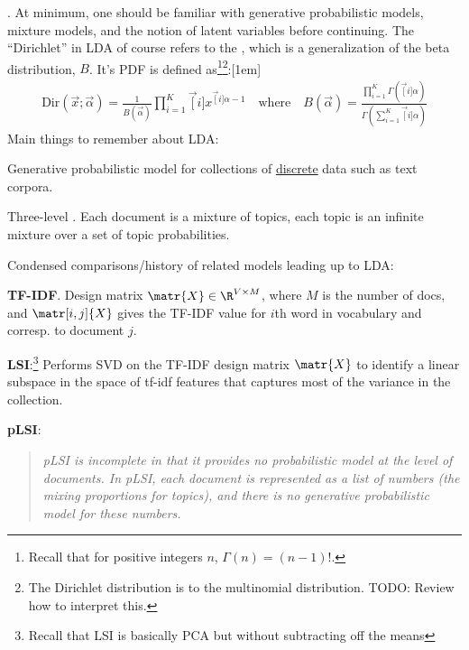 \documentclass[11pt]{article}
\begin{document}
\myspace
\p {}. At minimum, one should be familiar with generative probabilistic models, mixture models, and the notion of latent variables before continuing. The ``Dirichlet'' in LDA of course refers to the , which is a generalization of the beta distribution, $B$. It's PDF is defined as\footnote{
	Recall that for positive integers $n$, $\Gamma(n) = (n - 1)!$.
}\footnote{The Dirichlet distribution is  to the multinomial distribution. TODO: Review how to interpret this.}:[1em]
\begin{align}
\text{Dir}(\vec{x}; \vec{\alpha}) = \frac{1}{B(\vec{\alpha})} \prod_{i=1}^{K} \vec[i]{x}^{\vec[i]{\alpha} - 1} 
\quad \text{where} \quad
B(\vec{\alpha}) = \frac{ \prod_{i=1}^{K} \Gamma\left( \vec[i]{\alpha}\right) }{  \Gamma(\sum_{i=1}^{K} \vec[i]{\alpha}) }
\label{dirichlet}
\end{align}
Main things to remember about LDA:
\begin{compactitem}[-]
	\item Generative probabilistic model for collections of \underline{discrete} data such as text corpora.
	\item Three-level . Each document is a mixture of topics, each topic is an infinite mixture over a set of topic probabilities.
\end{compactitem}
Condensed comparisons/history of related models leading up to LDA:
\begin{compactitem}[-]
	\item \textbf{TF-IDF}. Design matrix $\matr{X} \in \R^{V \times M}$, where $M$ is the number of docs, and $\matr[i,j]{X}$ gives the TF-IDF value for $i$th word in vocabulary and corresp. to document $j$. 
	
	\item \textbf{LSI}:\footnote{Recall that LSI is basically PCA but without subtracting off the means} Performs SVD on the TF-IDF design matrix $\matr{X}$ to identify a linear subspace in the space of tf-idf features that captures most of the variance in the collection.
	
	\item \textbf{pLSI}: 
\end{compactitem}
\vspace{-1em}
\begin{quote}
	{\small \textit{pLSI is incomplete
			in that it provides no probabilistic model at the level of documents. In pLSI, each document is
			represented as a list of numbers (the mixing proportions for topics), and there is no generative
			probabilistic model for these numbers.}}
\end{quote}
\end{document}
